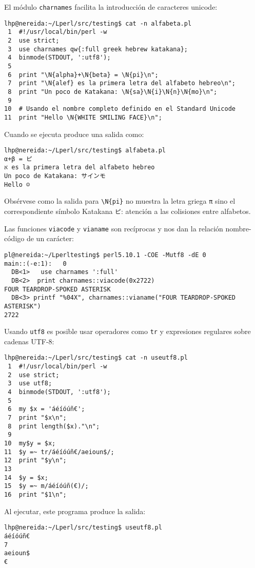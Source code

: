 \begin{htmlonly}
\begin{htmlonly}
El módulo \verb|charnames| facilita la introducción de caracteres unicode:
\begin{verbatim}
lhp@nereida:~/Lperl/src/testing$ cat -n alfabeta.pl
 1  #!/usr/local/bin/perl -w
 2  use strict;
 3  use charnames qw{:full greek hebrew katakana};
 4  binmode(STDOUT, ':utf8');
 5
 6  print "\N{alpha}+\N{beta} = \N{pi}\n";
 7  print "\N{alef} es la primera letra del alfabeto hebreo\n";
 8  print "Un poco de Katakana: \N{sa}\N{i}\N{n}\N{mo}\n";
 9
10  # Usando el nombre completo definido en el Standard Unicode
11  print "Hello \N{WHITE SMILING FACE}\n";
\end{verbatim}
Cuando se ejecuta produce una salida como:
\begin{verbatim}
lhp@nereida:~/Lperl/src/testing$ alfabeta.pl
α+β = ピ
א es la primera letra del alfabeto hebreo
Un poco de Katakana: サインモ
Hello ☺
\end{verbatim}
Obsérvese como la salida para \verb|\N{pi}| no muestra la letra griega 
\verb|π| sino el correspondiente símbolo Katakana \verb|ピ|: atención a las
colisiones entre alfabetos.

Las funciones \verb|viacode| y \verb|vianame| son recíprocas
y nos dan la relación nombre-código de un carácter:
\begin{verbatim}
pl@nereida:~/Lperltesting$ perl5.10.1 -COE -Mutf8 -dE 0
main::(-e:1):   0
  DB<1>   use charnames ':full'
  DB<2>  print charnames::viacode(0x2722)
FOUR TEARDROP-SPOKED ASTERISK
  DB<3> printf "%04X", charnames::vianame("FOUR TEARDROP-SPOKED ASTERISK")
2722
\end{verbatim}

Usando \verb|utf8| es posible usar operadores 
como \verb|tr| y expresiones regulares sobre cadenas UTF-8:
\begin{verbatim}
lhp@nereida:~/Lperl/src/testing$ cat -n useutf8.pl
 1  #!/usr/local/bin/perl -w
 2  use strict;
 3  use utf8;
 4  binmode(STDOUT, ':utf8');
 5
 6  my $x = 'áéíóúñ€';
 7  print "$x\n";
 8  print length($x)."\n";
 9
10  my$y = $x;
11  $y =~ tr/áéíóúñ€/aeioun$/;
12  print "$y\n";
13
14  $y = $x;
15  $y =~ m/áéíóúñ(€)/;
16  print "$1\n";
\end{verbatim}
Al ejecutar, este programa produce la salida:
\begin{verbatim}
lhp@nereida:~/Lperl/src/testing$ useutf8.pl
áéíóúñ€
7
aeioun$
€
\end{verbatim}



\end{htmlonly}
\end{htmlonly}
